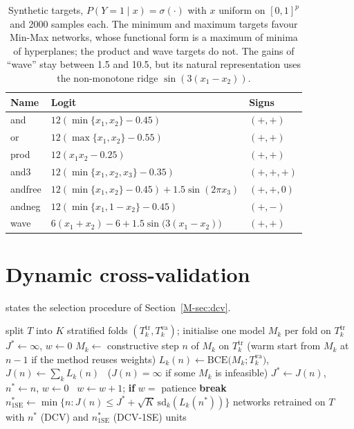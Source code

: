 \documentclass[11pt,a4paper]{article}
\newcommand{\sig}{\sigma}
\begin{document}
\begin{table}[H]\centering\small
\caption{Synthetic targets, $P(Y=1\mid x)=\sig(\cdot)$ with $x$ uniform on $[0,1]^p$ and 2000 samples each. The minimum
and maximum targets favour Min-Max networks, whose functional form is a maximum of minima of hyperplanes; the product and
wave targets do not. The gains of ``wave'' stay between 1.5 and 10.5, but its natural representation uses the
non-monotone ridge $\sin(3(x_1-x_2))$.}\label{tab:synthdef}
\begin{tabular}{lll}\toprule
Name & Logit & Signs \\\midrule
and & $12(\min\{x_1,x_2\}-0.45)$ & $(+,+)$ \\
or & $12(\max\{x_1,x_2\}-0.55)$ & $(+,+)$ \\
prod & $12(x_1x_2-0.25)$ & $(+,+)$ \\
and3 & $12(\min\{x_1,x_2,x_3\}-0.35)$ & $(+,+,+)$ \\
andfree & $12(\min\{x_1,x_2\}-0.45)+1.5\sin(2\pi x_3)$ & $(+,+,0)$ \\
andneg & $12(\min\{x_1,1-x_2\}-0.45)$ & $(+,-)$ \\
wave & $6(x_1+x_2)-6+1.5\sin\bigl(3(x_1-x_2)\bigr)$ & $(+,+)$ \\
\bottomrule\end{tabular}
\end{table}

\section{Dynamic cross-validation}\label{sup:dcv}
 states the selection procedure of Section~\ref{M-sec:dcv}.

\begin{algorithm}[H]
\caption{Dynamic cross-validation (DCV) inside a training set $T$.}\label{alg:dcv}
\begin{algorithmic}[1]
\State split $T$ into $K$ stratified folds $(T_k^{\mathrm{tr}},T_k^{\mathrm{va}})$; initialise one model $M_k$ per fold on $T_k^{\mathrm{tr}}$
\State $J^\ast\gets\infty$, $w\gets0$
   \State $M_k\gets$ constructive step $n$ of $M_k$ on $T_k^{\mathrm{tr}}$ (warm start from $M_k$ at $n-1$ if the method reuses weights) \EndFor
  \State $L_k(n)\gets\mathrm{BCE}\bigl(M_k;T_k^{\mathrm{va}}\bigr)$, $J(n)\gets\sum_k L_k(n)$ \ ($J(n)=\infty$ if some $M_k$ is infeasible)
   $J^\ast\gets J(n)$, $n^\ast\gets n$, $w\gets0$ \Else\ $w\gets w+1$; \textbf{if} $w=$ patience \textbf{break} \EndIf
\EndFor
\State $n^\ast_{1\mathrm{SE}}\gets\min\{n: J(n)\le J^\ast+\sqrt K\,\mathrm{sd}_k(L_k(n^\ast))\}$ 
\State \Return networks retrained on $T$ with $n^\ast$ (DCV) and $n^\ast_{1\mathrm{SE}}$ (DCV-1SE) units
\end{algorithmic}
\end{algorithm}
\end{document}
